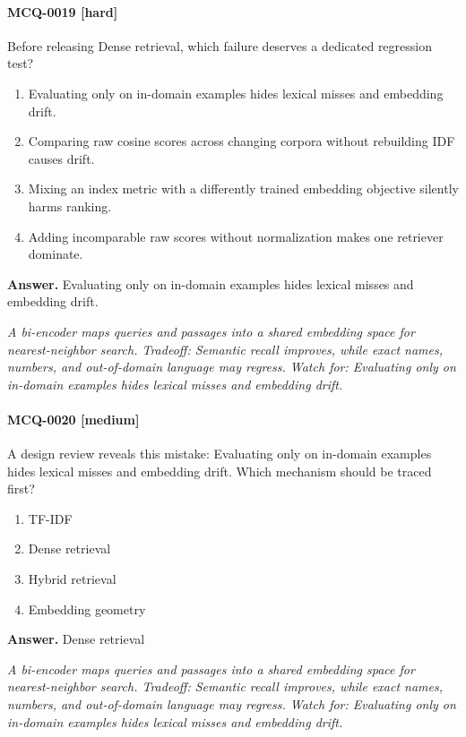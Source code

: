 \paragraph{MCQ-0019 [hard]} Before releasing Dense retrieval, which failure deserves a dedicated regression test?
\begin{enumerate}[label=\Alph*.]
\item Evaluating only on in-domain examples hides lexical misses and embedding drift.
\item Comparing raw cosine scores across changing corpora without rebuilding IDF causes drift.
\item Mixing an index metric with a differently trained embedding objective silently harms ranking.
\item Adding incomparable raw scores without normalization makes one retriever dominate.
\end{enumerate}
\noindent\textbf{Answer.} Evaluating only on in-domain examples hides lexical misses and embedding drift.
\par\textit{A bi-encoder maps queries and passages into a shared embedding space for nearest-neighbor search. Tradeoff: Semantic recall improves, while exact names, numbers, and out-of-domain language may regress. Watch for: Evaluating only on in-domain examples hides lexical misses and embedding drift.}
\paragraph{MCQ-0020 [medium]} A design review reveals this mistake: Evaluating only on in-domain examples hides lexical misses and embedding drift. Which mechanism should be traced first?
\begin{enumerate}[label=\Alph*.]
\item TF-IDF
\item Dense retrieval
\item Hybrid retrieval
\item Embedding geometry
\end{enumerate}
\noindent\textbf{Answer.} Dense retrieval
\par\textit{A bi-encoder maps queries and passages into a shared embedding space for nearest-neighbor search. Tradeoff: Semantic recall improves, while exact names, numbers, and out-of-domain language may regress. Watch for: Evaluating only on in-domain examples hides lexical misses and embedding drift.}
